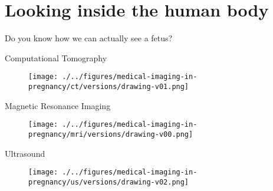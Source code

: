 \section{Looking inside the human body}




{
\begin{frame}{}

\BigSizeFont
Do you know how we can actually see a fetus?

\end{frame}
}


{
\begin{frame}{Computational Tomography}
      \begin{figure}
        \centering
        \texttt{[image: ./../figures/medical-imaging-in-pregnancy/ct/versions/drawing-v01.png]}
      \end{figure}
\end{frame}
}


{
\begin{frame}{Magnetic Resonance Imaging}
      \begin{figure}
        \centering
        \texttt{[image: ./../figures/medical-imaging-in-pregnancy/mri/versions/drawing-v00.png]}
      \end{figure}
\end{frame}
}


{
\begin{frame}{Ultrasound}
      \begin{figure}
        \centering
        \texttt{[image: ./../figures/medical-imaging-in-pregnancy/us/versions/drawing-v02.png]}
      \end{figure}
\end{frame}
}


